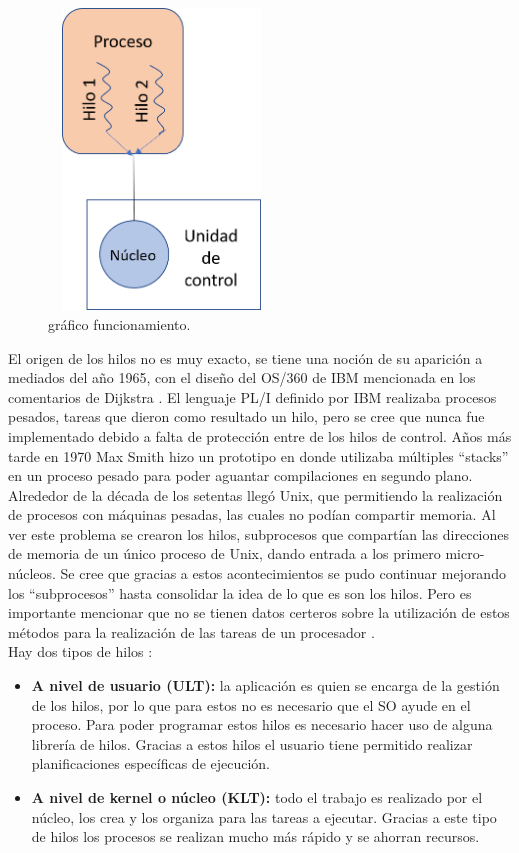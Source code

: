 \documentclass[12pt,letterpaper]{article}
\begin{document}
\begin{figure}[h]
    \centering
    \includegraphics[width=6cm, height=8cm]{Threads.png}
    \caption{\label{Figura 1} gráfico funcionamiento.}
\end{figure} 

El origen de los hilos no es muy exacto, se tiene una noción de su aparición a mediados del año 1965, con el diseño del OS/360 de IBM mencionada en los comentarios de Dijkstra \cite{Dijkstra}. El lenguaje PL/I definido por IBM realizaba procesos pesados, tareas que dieron como resultado un hilo, pero se cree que nunca fue implementado debido a falta de protección entre de los hilos de control. Años más tarde en 1970 Max Smith hizo un prototipo en donde utilizaba múltiples ``stacks'' en un proceso pesado para poder aguantar compilaciones en segundo plano. Alrededor de la década de los setentas llegó Unix, que permitiendo la realización de procesos con máquinas pesadas, las cuales no podían compartir memoria. Al ver este problema se crearon los hilos, subprocesos que compartían las direcciones de memoria de un único proceso de Unix, dando entrada a los primero micro-núcleos. Se cree que gracias a estos acontecimientos se pudo continuar mejorando los ``subprocesos'' hasta consolidar la idea de lo que es son los hilos. Pero es importante mencionar que no se tienen datos certeros sobre la utilización de estos métodos para la realización de las tareas de un procesador \cite{History}. \\[1.5cm]

Hay dos tipos de hilos \cite{THilos}: 
\begin{itemize}
    \item \textbf{A nivel de usuario (ULT):} la aplicación es quien se encarga de la gestión de los hilos, por lo que para estos no es necesario que el SO ayude en el proceso. Para poder programar estos hilos es necesario hacer uso de alguna librería de hilos. Gracias a estos hilos el usuario tiene permitido realizar planificaciones específicas de ejecución. 
    \item \textbf{A nivel de kernel o núcleo (KLT):} todo el trabajo es realizado por el núcleo, los crea y los organiza para las tareas a ejecutar. Gracias a este tipo de hilos los procesos se realizan mucho más rápido y se ahorran recursos.\\[0.5cm]
\end{itemize}
\end{document}
